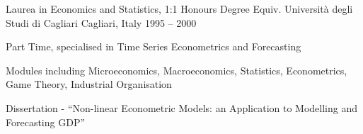 \begin{cventries}
  \cventry
    {Laurea in Economics and Statistics, 1:1 Honours Degree Equiv.} %
    {Università degli Studi di Cagliari} %
    {Cagliari, Italy} %
    {1995 – 2000} %
    {
      \begin{cvitems} %
        \item {Part Time, specialised in Time Series Econometrics and Forecasting}
        \item {Modules including Microeconomics, Macroeconomics, Statistics, Econometrics, Game Theory, Industrial Organisation}
        \item {Dissertation - “Non-linear Econometric Models: an Application to Modelling and Forecasting GDP”}
      \end{cvitems}
    }
\end{cventries}
